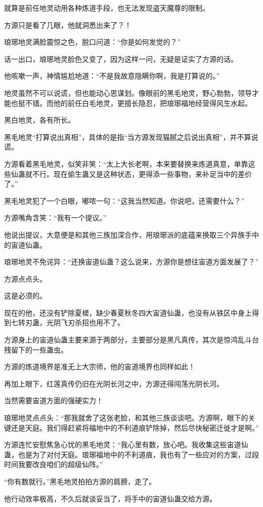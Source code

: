 \begin{this_body}
就算是前任地灵动用各种炼道手段，也无法发现盗天魔尊的限制。

方源只是看了几眼，他就洞悉出来了？！

琅琊地灵满脸震惊之色，脱口问道：“你是如何发觉的？”

话一出口，琅琊地灵脸色又变了，因为这样一问，无疑是证实了方源的话。

他咳嗽一声，神情尴尬地道：“不是我故意隐瞒你啊，我是打算说的。”

地灵虽然不可以说谎，但也能动心思谋划。像眼前的黑毛地灵，野心勃勃，领导才能也挺不错。而他的前任白毛地灵，更擅长隐忍，把琅琊福地经营得风生水起。

黑白地灵，各有所长。

黑毛地灵“打算说出真相”，具体的是指“当方源发现猫腻之后说出真相”，并不算说谎。

方源看着黑毛地灵，似笑非笑：“太上大长老啊，本来要替换来炼道真意，单靠这些仙蛊就不行。现在偷生蛊又是这种状态，更得添一些事物，来补足当中的差价了。”

黑毛地灵犯了一个白眼，嘟哝一句：“这我当然知道。你说吧，还需要什么？”

方源嘴角含笑：“我有一个提议。”

他说出提议，大意便是和其他三族加深合作，用琅琊派的底蕴来换取三个异族手中的宙道仙蛊。

琅琊地灵不免诧异：“还换宙道仙蛊？这么说来，方源你是想往宙道方面发展了？”

方源点点头。

这是必须的。

现在的他，还没有铲除夏槎，缺少春夏秋冬四大宙道仙蛊，也没有从铁区中身上得到七转刃蛊，光阴飞刃杀招也用不了。

方源身上的宙道仙蛊主要来源于两部分，主要部分是黑凡真传，其次是惊鸿乱斗台残留下的一些蛊虫。

方源的炼道境界是准无上大宗师，他的宙道境界也同样如此！

再加上眼下，红莲真传仍旧在光阴长河之中，方源还得闯荡光阴长河。

当然需要宙道方面的强硬实力！

琅琊地灵点点头：“那我就舍了这张老脸，和其他三族谈谈吧。方源啊，眼下的关键还是天庭。我们得赶紧将福地中的不利道痕铲除掉，然后尽快秘密迁徙才是啊。”

方源连忙安慰焦急心忧的黑毛地灵：“我心里有数，放心吧。我收集这些宙道仙蛊，也是为了对付天庭。琅琊福地中的不利道痕，我也有了一些应对的方案，过段时间我要改良咱们的超级仙阵。”

“你有数就行。”黑毛地灵拍拍方源的肩膀，走了。

他行动效率极高，不久后就谈妥当了，将手中的宙道仙蛊交给方源。


\end{this_body}
